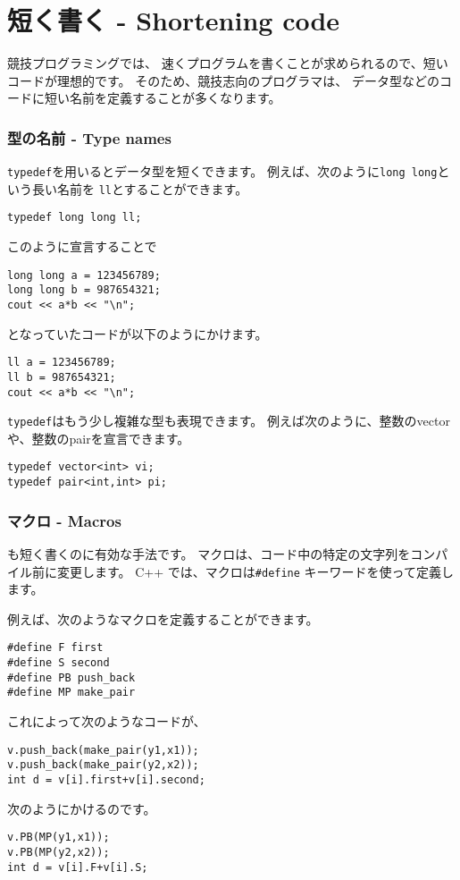 \section{短く書く - Shortening code}

競技プログラミングでは、
速くプログラムを書くことが求められるので、短いコードが理想的です。
そのため、競技志向のプログラマは、
データ型などのコードに短い名前を定義することが多くなります。

\subsubsection{型の名前 - Type names}
\texttt{typedef}を用いるとデータ型を短くできます。
例えば、次のように\texttt{long long}という長い名前を
\texttt{ll}とすることができます。

\begin{lstlisting}
typedef long long ll;
\end{lstlisting}

このように宣言することで
\begin{lstlisting}
long long a = 123456789;
long long b = 987654321;
cout << a*b << "\n";
\end{lstlisting}
となっていたコードが以下のようにかけます。
\begin{lstlisting}
ll a = 123456789;
ll b = 987654321;
cout << a*b << "\n";
\end{lstlisting}

\texttt{typedef}はもう少し複雑な型も表現できます。
例えば次のように、整数のvectorや、整数のpairを宣言できます。

\begin{lstlisting}
typedef vector<int> vi;
typedef pair<int,int> pi;
\end{lstlisting}

\subsubsection{マクロ -  Macros}

も短く書くのに有効な手法です。
マクロは、コード中の特定の文字列をコンパイル前に変更します。
C++ では、マクロは\texttt{\#define} キーワードを使って定義します。

例えば、次のようなマクロを定義することができます。

\begin{lstlisting}
#define F first
#define S second
#define PB push_back
#define MP make_pair
\end{lstlisting}
これによって次のようなコードが、
\begin{lstlisting}
v.push_back(make_pair(y1,x1));
v.push_back(make_pair(y2,x2));
int d = v[i].first+v[i].second;
\end{lstlisting}
次のようにかけるのです。
\begin{lstlisting}
v.PB(MP(y1,x1));
v.PB(MP(y2,x2));
int d = v[i].F+v[i].S;
\end{lstlisting}

